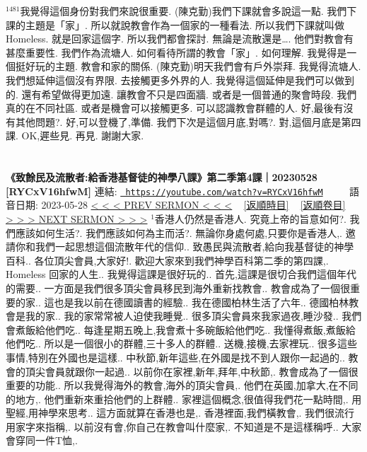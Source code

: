 \documentclass{book}
\begin{document}
$^{1481}$我覺得這個身份對我們來說很重要.
(陳克勤)我們下課就會多說這一點.
我們下課的主題是「家」.
所以就說教會作為一個家的一種看法.
所以我們下課就叫做Homeless.
就是回家這個字.
所以我們都會探討.
無論是流散還是….
他們對教會有甚麼重要性.
我們作為流塘人.
如何看待所謂的教會「家」.
如何理解.
我覺得是一個挺好玩的主題.
教會和家的關係.
(陳克勤)明天我們會有戶外崇拜.
我覺得流塘人.
我們想延伸這個沒有界限.
去接觸更多外界的人.
我覺得這個延伸是我們可以做到的.
還有希望做得更加遠.
讓教會不只是四面牆.
或者是一個普通的聚會時段.
我們真的在不同社區.
或者是機會可以接觸更多.
可以認識教會群體的人.
好,最後有沒有其他問題?.
好,可以登機了,準備.
我們下次是這個月底,對嗎?.
對,這個月底是第四課.
OK,遲些見.
再見.
謝謝大家.
\newpage



\section{}
\label{sec:RYCxV16hfwM}
\textbf{《致餘民及流散者:給香港基督徒的神學八課》第二季第4課｜20230528 [RYCxV16hfwM]}
\newline
\newline
連結: \href{https://youtube.com/watch?v=RYCxV16hfwM}{\texttt{ https://youtube.com/watch?v=RYCxV16hfwM}} ~~~~ 語音日期: 2023-05-28 
\newline
\newline
\hyperref[sec:OcD6qni0UQE]{\small{< < < PREV SERMON < < <}}
~
\hyperref[sec:index_chronic]{\small{[返順時目]}}
~
\hyperref[sec:index_scriptual]{\small{[返順卷目]}}
~
\hyperref[sec:40Zpw7rWZSQ]{\small{> > > NEXT SERMON > > >}}
\newline
\newline
$^{1}$香港人仍然是香港人.
究竟上帝的旨意如何?.
我們應該如何生活?.
我們應該如何為主而活?.
無論你身處何處,只要你是香港人,.
邀請你和我們一起思想這個流散年代的信仰..
致愚民與流散者,給向我基督徒的神學百科..
各位頂尖會員,大家好!.
歡迎大家來到我們神學百科第二季的第四課,.
Homeless 回家的人生..
我覺得這課是很好玩的..
首先,這課是很切合我們這個年代的需要..
一方面是我們很多頂尖會員移民到海外重新找教會..
教會成為了一個很重要的家..
這也是我以前在德國讀書的經驗..
我在德國柏林生活了六年..
德國柏林教會是我的家..
我的家常常被人迫使我睡覺..
很多頂尖會員來我家過夜,睡沙發..
我們會煮飯給他們吃..
每逢星期五晚上,我會煮十多碗飯給他們吃..
我懂得煮飯,煮飯給他們吃..
所以是一個很小的群體,三十多人的群體..
送機,接機,去家裡玩..
很多這些事情,特別在外國也是這樣..
中秋節,新年這些,在外國是找不到人跟你一起過的..
教會的頂尖會員就跟你一起過..
以前你在家裡,新年,拜年,中秋節,.
教會成為了一個很重要的功能..
所以我覺得海外的教會,海外的頂尖會員,.
他們在英國,加拿大,在不同的地方,.
他們重新來重拾他們的上群體..
家裡這個概念,很值得我們花一點時間,.
用聖經,用神學來思考..
這方面就算在香港也是,.
香港裡面,我們橫教會,.
我們很流行用家字來指稱,.
以前沒有會,你自己在教會叫什麼家,.
不知道是不是這樣稱呼..
大家會穿同一件T恤,.
\end{document}
